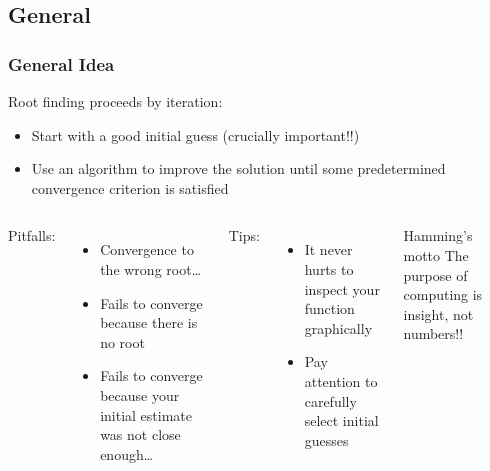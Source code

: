 \subsection*{General}
\begin{frame}[fragile]
  \frametitle{General Idea}
  Root finding proceeds by iteration:
  \begin{itemize}
    \item Start with a good initial guess (crucially important!!)
    \item Use an algorithm to improve the solution until some predetermined convergence criterion is satisfied
  \end{itemize}
  
  \begin{columns}
    Pitfalls:
    \begin{itemize}
      \item Convergence to the wrong root…
      \item Fails to converge because there is no root
      \item Fails to converge because your initial estimate was not close enough…
    \end{itemize}

    \pause
    Tips:
    \begin{itemize}
      \item It never hurts to inspect your function graphically
      \item Pay attention to carefully select initial guesses
    \end{itemize}
    \pause
    \begin{block}{Hamming's motto}
      The purpose of computing is insight, not numbers!!
    \end{block}
  \end{columns}
\end{frame}


